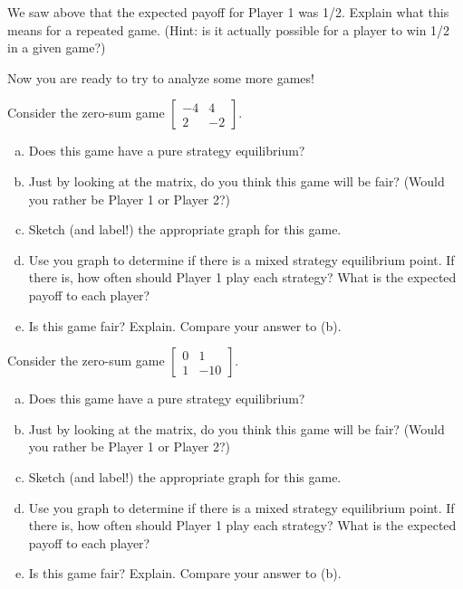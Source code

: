 \begin{xca}\label{E:graphexplainEV}
We saw above that the expected payoff for Player 1 was 1/2. Explain what this means for a repeated game. (Hint: is it actually possible for a player to win 1/2 in a given game?)
\end{xca}


Now you are ready to try to analyze some more games!

\begin{xca}\label{E:graph2practice}
Consider the zero-sum game $\left[\begin{matrix}
-4&4\\
2&-2

\end{matrix}\right].
$
\begin{enumerate}[(a)]
\item Does this game have a pure strategy equilibrium?
\item Just by looking at the matrix, do you think this game will be fair? (Would you rather be Player 1 or Player 2?)
\item Sketch (and label!) the appropriate graph for this game.
\item Use you graph to determine if there is a mixed strategy equilibrium point. If there is, how often should Player 1 play each strategy? What is the expected payoff to each player? 
\item Is this game fair? Explain. Compare your answer to (b).
\end{enumerate}
\end{xca}

\begin{xca}\label{E:graph3practice}
Consider the zero-sum game $\left[\begin{matrix}
0&1\\
1&-10

\end{matrix}\right].
$
\begin{enumerate}[(a)]
\item Does this game have a pure strategy equilibrium?
\item Just by looking at the matrix, do you think this game will be fair? (Would you rather be Player 1 or Player 2?)

\item Sketch (and label!) the appropriate graph for this game.
\item Use you graph to determine if there is a mixed strategy equilibrium point. If there is, how often should Player 1 play each strategy? What is the expected payoff to each player? 
\item Is this game fair? Explain. Compare your answer to (b).
\end{enumerate}

\end{xca}



 